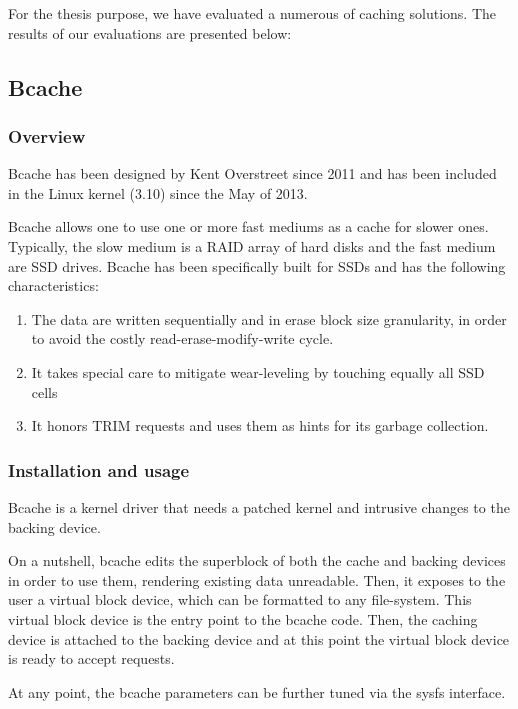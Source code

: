 For the thesis purpose, we have evaluated a numerous of caching solutions. The 
results of our evaluations are presented below:

\subsection{Bcache}

\subsubsection{Overview}

Bcache has been designed by Kent Overstreet since 2011 and has been included in 
the Linux kernel (3.10) since the May of 2013.

Bcache allows one to use one or more fast mediums as a cache for slower ones.  
Typically, the slow medium is a RAID array of hard disks and the fast medium 
are SSD drives. Bcache has been specifically built for SSDs and has the 
following characteristics:

\begin{enumerate}
	\item The data are written sequentially and in erase block size 
		granularity, in order to avoid the costly 
		read-erase-modify-write cycle.
	\item It takes special care to mitigate wear-leveling by touching 
		equally all SSD cells
	\item It honors TRIM requests and uses them as hints for its garbage 
		collection.
\end{enumerate}

\subsubsection{Installation and usage}

Bcache is a kernel driver that needs a patched kernel and intrusive changes to 
the backing device.

On a nutshell, bcache edits the superblock of both the cache and backing 
devices in order to use them, rendering existing data unreadable.  Then, it 
exposes to the user a virtual block device, which can be formatted to any 
file-system. This virtual block device is the entry point to the bcache code.  
Then, the caching device is attached to the backing device and at this point 
the virtual block device is ready to accept requests.

At any point, the bcache parameters can be further tuned via the sysfs 
interface.  

